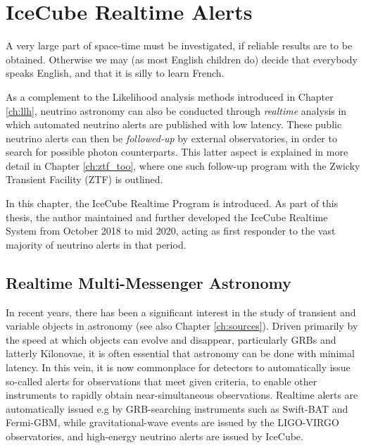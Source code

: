 \setchapterpreamble[u]{\margintoc}
\chapter{IceCube Realtime Alerts}
\begin{fquote}A very large part of space-time must be investigated, if reliable results are to be obtained. Otherwise we may (as most English children do) decide that everybody speaks English, and that it is silly to learn French.
\end{fquote}

As a complement to the Likelihood analysis methods introduced in Chapter \ref{ch:llh}, neutrino astronomy can also be conducted through \emph{realtime} analysis in which automated neutrino alerts are published with low latency. These public neutrino alerts can then be \emph{followed-up} by external observatories, in order to search for possible photon counterparts. This latter aspect is explained in more detail in Chapter \ref{ch:ztf_too}, where one such follow-up program with the Zwicky Transient Facility (ZTF) is outlined.

In this chapter, the IceCube Realtime Program is introduced. As part of this thesis, the author maintained and further developed the IceCube Realtime System from October 2018 to mid 2020, acting as first responder to the vast majority of neutrino alerts in that period.

\section{Realtime Multi-Messenger Astronomy}

In recent years, there has been a significant interest in the study of transient and variable objects in astronomy (see also Chapter \ref{ch:sources}). Driven primarily by the speed at which objects can evolve and disappear, particularly GRBs and latterly Kilonovae, it is often essential that astronomy can be done with minimal latency. In this vein, it is now commonplace for detectors to automatically issue so-called alerts for observations that meet given criteria, to enable other instruments to rapidly obtain near-simultaneous observations. Realtime alerts are automatically issued e.g by GRB-searching instruments such as Swift-BAT and Fermi-GBM, while gravitational-wave events are issued by the LIGO-VIRGO observatories, and high-energy neutrino alerts are issued by IceCube.


